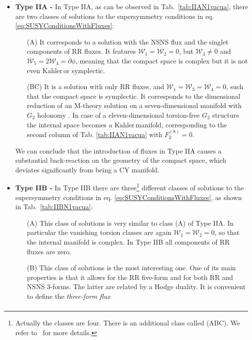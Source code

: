 \documentclass[12pt,a4paper]{book}
\newcommand{\Kahler}{\ensuremath{\text{K}\ddot{\text{a}}\text{hler}\,}}
\begin{document}
\begin{itemize}
\item \textbf{Type IIA -} In Type IIA, as can be observed in Tab.~\ref{tab:IIAN1vacua}, there are two classes of solutions to the supersymmetry conditions in eq. \eqref{eq:SUSYConditionsWithFluxes}:
\begin{itemize}
\item[(A)] It corresponds to a solution with the NSNS flux and the singlet components of RR fluxes. It features $\mathcal{W}_1 = \mathcal{W}_2 = 0$, but $\mathcal{W}_3 \neq 0$ and $\overline{\mathcal{W}}_5 = 2 \mathcal{W}_4 = \overline{\partial} \phi$, meaning that the compact space is complex but it is not even \Kahler or symplectic.
\item[(BC)] It is a solution with only RR fluxes, and $\mathcal{W}_1 = \mathcal{W}_3 = \mathcal{W}_4 = 0$, such that the compact space is symplectic. It corresponds to the dimensional reduction of an M-theory solution on a seven-dimensional manifold with $G_2$ holonomy \cite{Kaste:2003dh}. In case of a eleven-dimensional torsion-free $G_2$ structure the internal space becomes a \Kahler manifold, corresponding to the second column of Tab. \ref{tab:IIAN1vacua} with $F_2^{(8)} = 0$.
\end{itemize}
We can conclude that the introduction of fluxes in Type IIA causes a substantial back-reaction on the geometry of the compact space, which deviates significantly from being a CY manifold.
\item \textbf{Type IIB -} In Type IIB there are three\footnote{Actually the classes are four. There is an additional class called (ABC). We refer to~\cite{Grana:2004sv} for more details.} different classes of solutions to the supersymmetry conditions in eq. \eqref{eq:SUSYConditionsWithFluxes}, as shown in Tab.~\ref{tab:IIBN1vacua}:
\begin{itemize}
\item[(A)] This class of solutions is very similar to class (A) of Type IIA. In particular the vanishing torsion classes are again $\mathcal{W}_1 = \mathcal{W}_2 = 0$, so that the internal manifold is complex. In Type IIB all components of RR fluxes are zero.
\item[(B)] This class of solutions is the most interesting one. One of its main properties is that it allows for the RR five-form and for both RR and NSNS $3$-forms. The latter are related by a Hodge duality. It is convenient to define the \textit{three-form flux}
\begin{align}
\label{eq:G3Definition}

\end{align}
\end{itemize}
\end{itemize}
\end{document}
